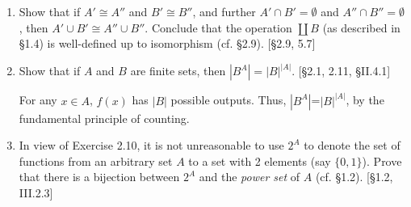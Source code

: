 \begin{enumerate}
    \item Show that if $A' \cong A''$ and $B' \cong B''$, and further $A' \cap B' = \emptyset$ and $A'' \cap B'' = \emptyset$, then $A' \cup B' \cong A'' \cup B''$. Conclude that the operation $\coprod B$ (as described in \S1.4) is well-defined up to isomorphism (cf. \S2.9). [\S2.9, 5.7]

    \item Show that if $A$ and $B$ are finite sets, then $|B^A| = |B|^{|A|}$. [\S2.1, 2.11, \S II.4.1]

          \begin{solution}
              For any $x\in A$, $f(x)$ has $|B|$ possible outputs. Thus, $|B^A|$=$|B|^{|A|}$, by the fundamental principle of counting.
          \end{solution}

    \item In view of Exercise 2.10, it is not unreasonable to use $2^A$ to denote the set of functions from an arbitrary set $A$ to a set with 2 elements (say $\{0,1\}$). Prove that there is a bijection between $2^A$ and the \textit{power set} of $A$ (cf. \S1.2). [\S1.2, III.2.3]

\end{enumerate}